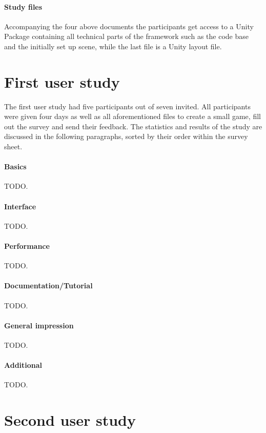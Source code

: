 \paragraph{Study files} Accompanying the four above documents the participants get access to a Unity Package containing all technical parts of the framework such as the code base and the initially set up scene, while the last file is a Unity layout file. 

\section{First user study}
The first user study had five participants out of seven invited. All participants were given four days as well as all aforementioned files to create a small game, fill out the survey and send their feedback. The statistics and results of the study are discussed in the following paragraphs, sorted by their order within the survey sheet.
\paragraph{Basics} TODO.
\paragraph{Interface} TODO.
\paragraph{Performance} TODO.
\paragraph{Documentation/Tutorial} TODO.
\paragraph{General impression} TODO.
\paragraph{Additional} TODO.

\section{Second user study}
